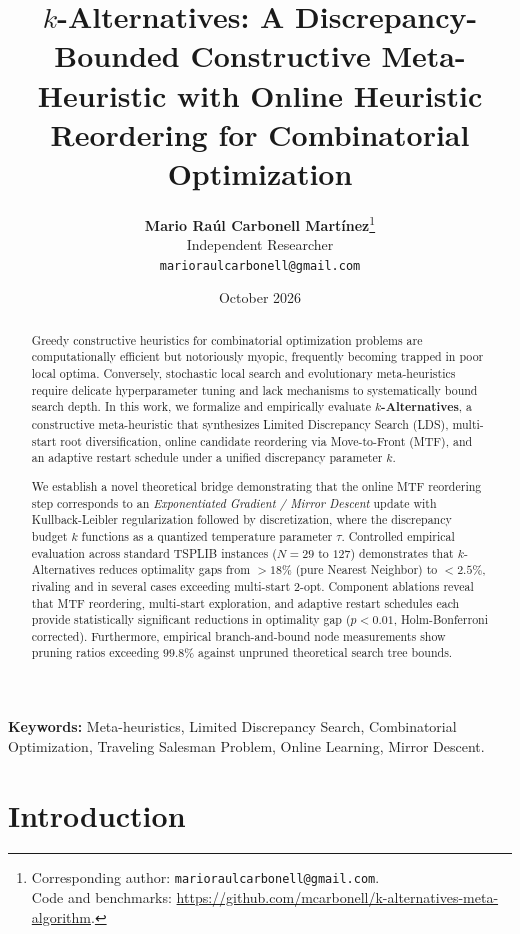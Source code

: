 \documentclass[11pt,a4paper]{article}
\title{\textbf{$k$-Alternatives: A Discrepancy-Bounded Constructive Meta-Heuristic with Online Heuristic Reordering for Combinatorial Optimization}}
\author{
  \textbf{Mario Raúl Carbonell Martínez}\thanks{Corresponding author: \texttt{marioraulcarbonell@gmail.com}.\\Code and benchmarks: \url{https://github.com/mcarbonell/k-alternatives-meta-algorithm}.} \\
  Independent Researcher \\
  \texttt{marioraulcarbonell@gmail.com}
}
\date{October 2026}
\begin{document}
\maketitle

\begin{abstract}
Greedy constructive heuristics for combinatorial optimization problems are computationally efficient but notoriously myopic, frequently becoming trapped in poor local optima. Conversely, stochastic local search and evolutionary meta-heuristics require delicate hyperparameter tuning and lack mechanisms to systematically bound search depth. In this work, we formalize and empirically evaluate \textbf{$k$-Alternatives}, a constructive meta-heuristic that synthesizes Limited Discrepancy Search (LDS), multi-start root diversification, online candidate reordering via Move-to-Front (MTF), and an adaptive restart schedule under a unified discrepancy parameter $k$. 

We establish a novel theoretical bridge demonstrating that the online MTF reordering step corresponds to an \textit{Exponentiated Gradient / Mirror Descent} update with Kullback-Leibler regularization followed by discretization, where the discrepancy budget $k$ functions as a quantized temperature parameter $\tau$. Controlled empirical evaluation across standard TSPLIB instances ($N=29$ to $127$) demonstrates that $k$-Alternatives reduces optimality gaps from $>18\%$ (pure Nearest Neighbor) to $<2.5\%$, rivaling and in several cases exceeding multi-start 2-opt. Component ablations reveal that MTF reordering, multi-start exploration, and adaptive restart schedules each provide statistically significant reductions in optimality gap ($p < 0.01$, Holm-Bonferroni corrected). Furthermore, empirical branch-and-bound node measurements show pruning ratios exceeding $99.8\%$ against unpruned theoretical search tree bounds.
\end{abstract}

\vspace{0.5em}
\noindent\textbf{Keywords:} Meta-heuristics, Limited Discrepancy Search, Combinatorial Optimization, Traveling Salesman Problem, Online Learning, Mirror Descent.

\newpage

\section{Introduction}
\label{sec:intro}
\end{document}
